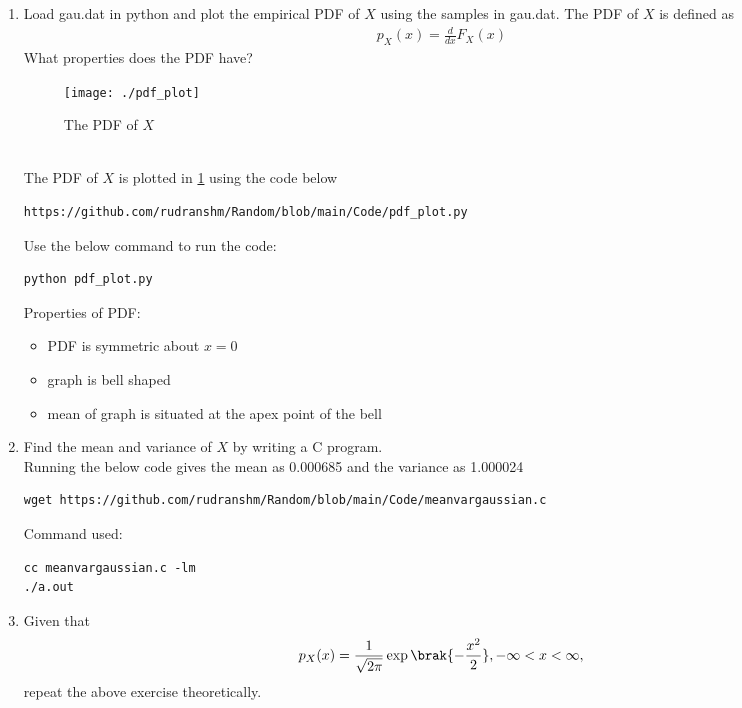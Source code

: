 \documentclass[journal,12pt,twocolumn]{IEEEtran}
\begin{document}
\begin{enumerate}[label=\thesection.\arabic*
,ref=\thesection.\theenumi]
\item
Load gau.dat in python and plot the empirical PDF of $X$ using the samples in gau.dat. The PDF of $X$ is defined as
\begin{align}
p_{X}(x) = \frac{d}{dx}F_{X}(x)
\end{align}
What properties does the PDF have?
\\
\begin{figure}[h]
\centering
\texttt{[image: ./pdf\_plot]}
\caption{The PDF of $X$}
\label{fig:gauss_pdf}
\end{figure}
\\
\solution The PDF of $X$ is plotted in \ref{fig:gauss_pdf} using the code below
\begin{lstlisting}
https://github.com/rudranshm/Random/blob/main/Code/pdf_plot.py
\end{lstlisting}
Use the below command to run the code:
\begin{lstlisting}
python pdf_plot.py
\end{lstlisting}
Properties of PDF:

\begin{itemize}
\item PDF is symmetric about $x=0$\\
\item graph is bell shaped\\
\item mean of graph is situated at the apex point of the bell\\
\end{itemize}
\item Find the mean and variance of $X$ by writing a C program.\\
\solution
Running the below code gives the mean as 0.000685 and the variance as 1.000024
 \begin{lstlisting}
wget https://github.com/rudranshm/Random/blob/main/Code/meanvargaussian.c
\end{lstlisting}
Command used:
\begin{lstlisting}
cc meanvargaussian.c -lm
./a.out
\end{lstlisting}
\item Given that 
\begin{align}
p_{X}(x) = \frac{1}{\sqrt{2\pi}}\exp\brak{-\frac{x^2}{2}}, -\infty < x < \infty,
\end{align}
repeat the above exercise theoretically.
%
\end{enumerate}
\end{document}
